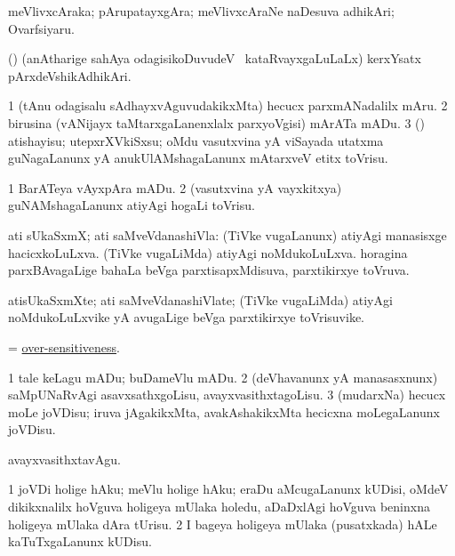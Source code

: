 \bentry
{}
\gl{\nA}
\bmng
meVlivxcAraka; pArupatayxgAra; meVlivxcAraNe naDesuva adhikAri; Ovarfsiyaru. 
\emng

\noindent
\gl{\pagu}
\bmng
{} (\ca) (anAtharige sahAya odagisikoDuvudeV \mo\ kataRvayxgaLuLaLx) kerxYsatx pArxdeVshikAdhikAri. 
\emng
\eentry


\bentry
{}
\gl{\sakirx}
\bmng
\bnum
\num{1} (tAnu odagisalu sAdhayxvAguvudakikxMta) hecucx parxmANadalilx mAru. 
\num{2} birusina (vANijayx taMtarxgaLanenxlalx parxyoVgisi) mArATa mADu. 
\num{3} (\rUpa) atishayisu; utepxrXVkiSxsu; oMdu vasutxvina yA viSayada utatxma guNagaLanunx yA anukUlAMshagaLanunx mAtarxveV etitx toVrisu. 
\enum
\emng

\noindent
\gl{\akirx}
\bmng
\bnum
\num{1} BarATeya vAyxpAra mADu.
\num{2} (vasutxvina yA vayxkitxya) guNAMshagaLanunx atiyAgi hogaLi toVrisu. 
\enum
\emng
\eentry


\bentry
{}
\gl{\gu}
\bmng
ati sUkaSxmX; ati saMveVdanashiVla: 
\banum
{} (TiVke \mo vugaLanunx) atiyAgi manasisxge hacicxkoLuLxva. 
 (TiVke \mo vugaLiMda) atiyAgi noMdukoLuLxva. 
 horagina parxBAvagaLige bahaLa beVga parxtisapxMdisuva, parxtikirxye toVruva. 
\eanum
\emng
\eentry


\bentry
{}
\gl{\nA}
\bmng
atisUkaSxmXte; ati saMveVdanashiVlate; (TiVke \mo vugaLiMda) atiyAgi noMdukoLuLxvike yA avugaLige beVga parxtikirxye toVrisuvike. 
\emng
\eentry


\bentry
{}
\gl{\nA}
\bmng
= \hyperlink{over-sensitiveness}{over-sensitiveness}. 
\emng
\eentry


\bentry
{}
\gl{\kirx}


\noindent
\gl{\sakirx}
\bmng
\bnum
\num{1} tale keLagu mADu; buDameVlu mADu. 
\num{2} (deVhavanunx yA manasasxnunx) saMpUNaRvAgi asavxsathxgoLisu, avayxvasithxtagoLisu. 
\num{3} (mudarxNa) hecucx moLe joVDisu; iruva jAgakikxMta, avakAshakikxMta hecicxna moLegaLanunx joVDisu. 
\enum
\emng

\noindent
\gl{\akirx}
\bmng
avayxvasithxtavAgu. 
\emng
\eentry


\bentry
{}
\gl{\sakirx}
\bmng
\bnum
\num{1} joVDi holige hAku; meVlu holige hAku; eraDu aMcugaLanunx kUDisi, oMdeV dikikxnalilx hoVguva holigeya mUlaka holedu, aDaDxlAgi hoVguva beninxna holigeya mUlaka dAra tUrisu. 
\num{2} I bageya holigeya mUlaka (pusatxkada) hALe kaTuTxgaLanunx kUDisu. 
\enum
\emng
\eentry

